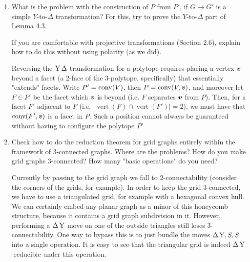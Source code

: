 \documentclass{article}
\begin{document}
\begin{enumerate}
\item What is the problem with the construction of $P$ from $P'$, if $G \to G'$ is a simple $Y$-to-$\Delta$ transformation? For this, try to prove the $Y$-to-$\Delta$ part of Lemma 4.3.

If you are comfortable with projective transformations (Section 2.6), explain how to do this without using polarity (as we did).

\begin{solution}
    Reversing the $\operatorname{Y}\Delta$ transformation for a polytope requires placing a vertex $\textbf{\textit{v}}$ beyond a facet (a 2-face of the 3-polytope, specifically) that essentially "extends" facets. Write $P' = \operatorname{conv}(V)$, then $P = \operatorname{conv}(V, \textbf{\textit{v}})$, and moreover let $F \in P'$ be the facet which $\textbf{\textit{v}}$ is beyond (i.e. $F$ separates $\textbf{\textit{v}}$ from $P$). Then, for a facet $F'$ adjacent to $F$ (i.e. $|\operatorname{vert}(F) \cap \operatorname{vert}(F')| = 2$), we must have that $\operatorname{conv}(F', \textbf{\textit{v}})$ is a facet in $P$. Such a position cannot always be guaranteed without having to configure the polytope $P'$
\end{solution}

\item Check how to do the reduction theorem for grid graphs entirely within the framework of $3$-connected graphs. Where are the problems? How do you make grid graphs $3$-connected? How many "basic operations" do you need?

\begin{solution}
Currently by passing to the grid graph we fall to $2$-connectability (consider the corners of the grids, for example). In order to keep the grid $3$-connected, we have to use a triangulated grid, for example with a hexagonal convex hull. We can certainly embed any planar graph as a minor of this honeycomb structure, because it contains a grid graph subdivision in it. However, performing a $\Delta \operatorname{Y}$ move on one of the outside triangles still loses $3$-connectability. One way to bypass this is to just bundle the moves $\Delta \operatorname{Y}, S, S$ into a single operation. It is easy to see that the triangular grid is indeed $\Delta \operatorname{Y}$-reducible under this operation.

\begin{figure}[h]
    \centering
{}
\end{figure}
\end{solution}
\end{enumerate}
\end{document}

